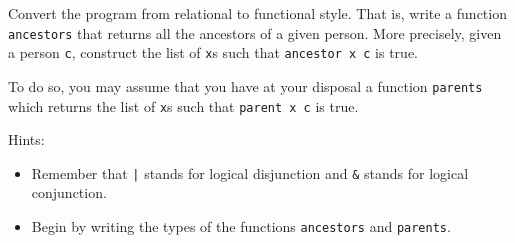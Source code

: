 \documentclass{article}
\begin{document}
Convert the program from relational to functional style. That is,
write a function \texttt{ancestors} that returns all the ancestors of
a given person.  More precisely, given a person \texttt{c}, construct the
list of \texttt{x}s such that \texttt{ancestor x c} is true.

To do so, you may assume that you have at your disposal a function
\texttt{parents} which returns the list of \texttt{x}s such that
\texttt{parent x c} is true.

Hints: 
\begin{itemize}
\item Remember that \texttt{|} stands for logical disjunction and
  \texttt{\&} stands for logical conjunction.
\item Begin by writing the types of the functions \texttt{ancestors}
  and \texttt{parents}.
\end{itemize}
\end{document}
